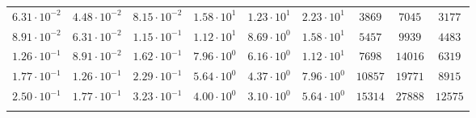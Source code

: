 \begin{tabular}{c c c c c c c c c}
$6.31{\cdot} 10^{-2}$ & $4.48{\cdot} 10^{-2}$ & $8.15{\cdot} 10^{-2}$ & $1.58{\cdot} 10^{1}$ & $1.23{\cdot} 10^{1}$ & $2.23{\cdot} 10^{1}$ & $      3869$ & $      7045$ & $   3177$\\
$8.91{\cdot} 10^{-2}$ & $6.31{\cdot} 10^{-2}$ & $1.15{\cdot} 10^{-1}$ & $1.12{\cdot} 10^{1}$ & $8.69{\cdot} 10^{0}$ & $1.58{\cdot} 10^{1}$ & $      5457$ & $      9939$ & $   4483$\\
$1.26{\cdot} 10^{-1}$ & $8.91{\cdot} 10^{-2}$ & $1.62{\cdot} 10^{-1}$ & $7.96{\cdot} 10^{0}$ & $6.16{\cdot} 10^{0}$ & $1.12{\cdot} 10^{1}$ & $      7698$ & $     14016$ & $   6319$\\
$1.77{\cdot} 10^{-1}$ & $1.26{\cdot} 10^{-1}$ & $2.29{\cdot} 10^{-1}$ & $5.64{\cdot} 10^{0}$ & $4.37{\cdot} 10^{0}$ & $7.96{\cdot} 10^{0}$ & $     10857$ & $     19771$ & $   8915$\\
$2.50{\cdot} 10^{-1}$ & $1.77{\cdot} 10^{-1}$ & $3.23{\cdot} 10^{-1}$ & $4.00{\cdot} 10^{0}$ & $3.10{\cdot} 10^{0}$ & $5.64{\cdot} 10^{0}$ & $     15314$ & $     27888$ & $  12575$\\
\hline \\
\end{tabular}
